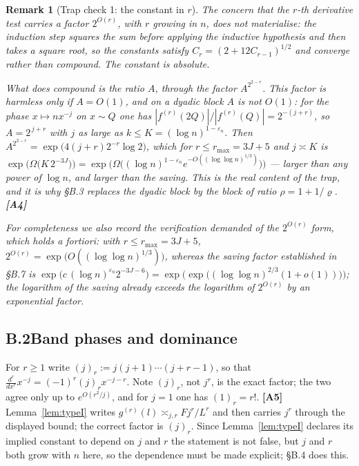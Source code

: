 \documentclass[11pt]{article}
\newtheorem{remark}[theorem]{Remark}
\theoremstyle{definition}
\theoremstyle{plain}
\begin{document}
\begin{remark}[Trap check 1: the constant in $r$]\label{rem:trap1}
The concern that the $r$-th derivative test carries a factor
$2^{O(r)}$, with $r$ growing in $n$, does not materialise: the induction
step \emph{squares} the sum before applying the inductive hypothesis and
then takes a square root, so the constants satisfy
$C_{r}=(2+12C_{r-1})^{1/2}$ and converge rather than compound.  The
constant is absolute.

What does compound is the \emph{ratio} $A$, through the factor
$A^{2^{2-r}}$.  This factor is harmless only if $A=O(1)$, and on a
\emph{dyadic} block $A$ is not $O(1)$: for the phase $x\mapsto n x^{-j}$
on $x\sim Q$ one has
$|f^{(r)}(2Q)|/|f^{(r)}(Q)|=2^{-(j+r)}$, so $A=2^{\,j+r}$ with $j$ as
large as $k\le K=(\log n)^{1-\varepsilon_{n}}$.  Then
$A^{2^{2-r}}=\exp\bigl(4(j+r)2^{-r}\log2\bigr)$, which for
$r\le r_{\max}=3J+5$ and $j\asymp K$ is
$\exp\bigl(\Omega\bigl(K\,2^{-3J}\bigr)\bigr)
=\exp\bigl(\Omega\bigl((\log n)^{1-\varepsilon_{n}}
e^{-O((\log\log n)^{1/3})}\bigr)\bigr)$
--- larger than any power of $\log n$, and larger than the saving.  This
is the real content of the trap, and it is why \S B.3 replaces the dyadic
block by the block of ratio $\rho=1+1/\varrho$.  \textbf{[A4]}

For completeness we also record the verification demanded of the
$2^{O(r)}$ form, which holds a fortiori: with $r\le r_{\max}=3J+5$,
$2^{O(r)}=\exp\bigl(O((\log\log n)^{1/3})\bigr)$, whereas the saving
factor established in \S B.7 is
$\exp\bigl(c\,(\log n)^{\varepsilon_{n}}2^{-3J-6}\bigr)
=\exp\bigl(\exp\bigl((\log\log n)^{2/3}(1+o(1))\bigr)\bigr)$; the
logarithm of the saving already exceeds the logarithm of $2^{O(r)}$ by
an exponential factor.
\end{remark}

\subsection*{B.2\quad Band phases and dominance}

For $r\ge1$ write $(j)_{r}:=j(j+1)\cdots(j+r-1)$, so that
$\frac{d^{r}}{dx^{r}}x^{-j}=(-1)^{r}(j)_{r}x^{-j-r}$.  Note $(j)_{r}$,
not $j^{r}$, is the exact factor; the two agree only up to
$e^{O(r^{2}/j)}$, and for $j=1$ one has $(1)_{r}=r!$.  \textbf{[A5]}
Lemma~\ref{lem:typeI} writes $g^{(r)}(l)\asymp_{j,r}Fj^{r}/L^{r}$ and
then carries $j^{r}$ through the displayed bound; the correct factor is
$(j)_{r}$.  Since Lemma~\ref{lem:typeI} declares its implied constant to
depend on $j$ and $r$ the statement is not false, but $j$ and $r$ both
grow with $n$ here, so the dependence must be made explicit; \S B.4 does
this.
\end{document}
